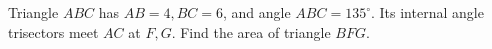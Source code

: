 Triangle $ABC$ has $AB=4,BC=6$, and angle $ABC=135^\circ$. Its internal angle trisectors meet $AC$ at $F,G$. Find the area of triangle $BFG$.

